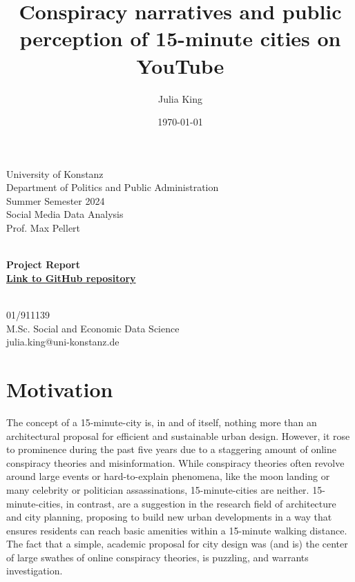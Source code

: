 \documentclass[fontsize=11pt, parskip=half]{scrartcl}
\title{Conspiracy narratives and public perception of 15-minute cities on YouTube}\let\Title\@title
\author{Julia King}          \let\Author\@author
\date{\today}           \let\Date\@date
\makeatletter
\def \papersubtitle {Project Report}
\def \paperdeadline {\href{https://github.com/julia-king-edu/so-24_smda_project}{Link to GitHub repository}}
\def \paperevaluator {Prof. Max Pellert}
\def \paperseminar {Social Media Data Analysis}
\def \papersemester {Summer Semester 2024}
\def \paperdepartment {Department of Politics and Public Administration}
\def \paperuniversity {University of Konstanz}
\def \paperemail {julia.king@uni-konstanz.de}
\def \paperprogramme {M.Sc. Social and Economic Data Science}
\def \papermatriculationnr {01/911139}
\makeatother
\begin{document}
\setlength{\columnsep}{25pt}

\begin{titlepage}
    \newcommand{\HRule}{\rule{\linewidth}{0.5mm}}
    
    \begin{flushleft} %
        \large
        \paperuniversity\\
        \paperdepartment\\
        \papersemester\\
        \paperseminar\\
        \paperevaluator
    \end{flushleft}
    
    \vfill
    
    \begin{center} %
        \huge\bfseries \Title\\
        \vspace{0.5cm}
        \large \papersubtitle \\
        \vspace{0.5cm}
        \small \paperdeadline
    \end{center}
    
    \vfill
    
    \begin{flushright} %
        \large
        \Author\\
        \papermatriculationnr\\
        \paperprogramme\\
        \paperemail
    \end{flushright}
\end{titlepage}

\clearpage
\setcounter{page}{1}

\section{Motivation}
\label{section:motivation}

    The concept of a 15-minute-city is, in and of itself, nothing more than an architectural proposal for efficient and sustainable urban design. However, it rose to prominence during the past five years due to a staggering amount of online conspiracy theories and misinformation. While conspiracy theories often revolve around large events or hard-to-explain phenomena, like the moon landing or many celebrity or politician assassinations, 15-minute-cities are neither. 15-minute-cities, in contrast, are a suggestion in the research field of architecture and city planning, proposing to build new urban developments in a way that ensures residents can reach basic amenities within a 15-minute walking distance. The fact that a simple, academic proposal for city design was (and is) the center of large swathes of online conspiracy theories, is puzzling, and warrants investigation. 
    
\end{document}
